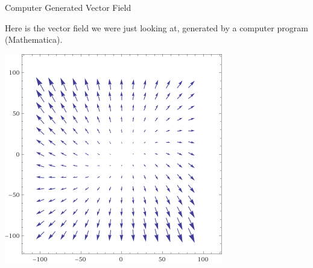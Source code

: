 \documentclass{beamer}
\begin{document}

\begin{frame}{Computer Generated Vector Field}

Here is the vector field we were just looking at, generated by a computer program (Mathematica).

\pause

\begin{center}
\includegraphics[scale=0.35]{vector_field1}
\end{center}
\end{frame}

\end{document}
